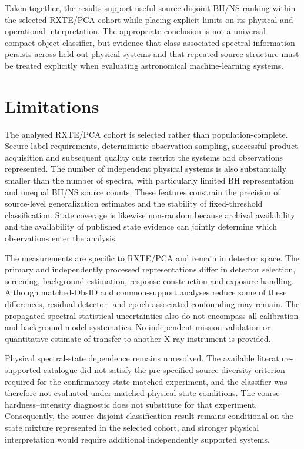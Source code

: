 \documentclass[final,5p,authoryear,nopreprintline]{elsarticle}
\begin{document}
Taken together, the results support useful source-disjoint BH/NS ranking within the selected RXTE/PCA cohort while placing explicit limits on its physical and operational interpretation. The appropriate conclusion is not a universal compact-object classifier, but evidence that class-associated spectral information persists across held-out physical systems and that repeated-source structure must be treated explicitly when evaluating astronomical machine-learning systems.

\section{Limitations}
\label{sec:11}

The analysed RXTE/PCA cohort is selected rather than population-complete. Secure-label requirements, deterministic observation sampling, successful product acquisition and subsequent quality cuts restrict the systems and observations represented. The number of independent physical systems is also substantially smaller than the number of spectra, with particularly limited BH representation and unequal BH/NS source counts. These features constrain the precision of source-level generalization estimates and the stability of fixed-threshold classification. State coverage is likewise non-random because archival availability and the availability of published state evidence can jointly determine which observations enter the analysis.

The measurements are specific to RXTE/PCA and remain in detector space. The primary and independently processed representations differ in detector selection, screening, background estimation, response construction and exposure handling. Although matched-ObsID and common-support analyses reduce some of these differences, residual detector- and epoch-associated confounding may remain. The propagated spectral statistical uncertainties also do not encompass all calibration and background-model systematics. No independent-mission validation or quantitative estimate of transfer to another X-ray instrument is provided.

Physical spectral-state dependence remains unresolved. The available literature-supported catalogue did not satisfy the pre-specified source-diversity criterion required for the confirmatory state-matched experiment, and the classifier was therefore not evaluated under matched physical-state conditions. The coarse hardness--intensity diagnostic does not substitute for that experiment. Consequently, the source-disjoint classification result remains conditional on the state mixture represented in the selected cohort, and stronger physical interpretation would require additional independently supported systems.
\end{document}
